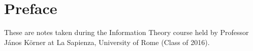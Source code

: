 \chapter{Preface}

These are notes taken during the Information Theory course held by Professor J\'anos K\"{o}rner at La Sapienza, University of Rome (Class of 2016).